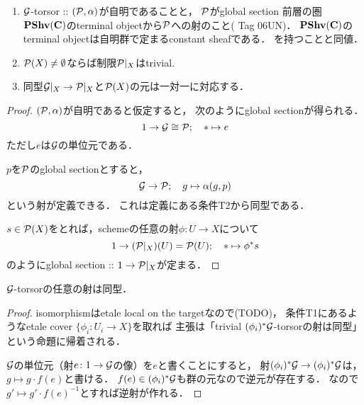     \begin{Lemma}
        \enumfix
        \begin{enumerate}
            \item 
            $\mathcal{G}$-torsor :: $(\mathcal{P}, \alpha)$が自明であることと，
            $\mathcal{P}$がglobal section\tablefootnote
            {
                前層の圏$\mathbf{PShv}(\mathbf{C})$のterminal objectから$\mathcal{P}$への射のこと(\cite{SP} Tag 06UN)．
                $\mathbf{PShv}(\mathbf{C})$のterminal objectは自明群で定まるconstant sheafである．
            }
            を持つことと同値．

            \item $\mathcal{P}(X) \neq \emptyset$ならば制限$\mathcal{P}|_{X}$はtrivial.

            \item 同型$\mathcal{G}|_{X} \to \mathcal{P}|_{X}$と$\mathcal{P}(X)$の元は一対一に対応する．
        \end{enumerate}
    \end{Lemma}
    \begin{proof}
        $(\mathcal{P}, \alpha)$が自明であると仮定すると，
        次のようにglobal sectionが得られる．
        \[ 1 \to \mathcal{G} \cong \mathcal{P}; \quad * \mapsto e \]
        ただし$e$は$\mathcal{G}$の単位元である．

        $p$を$\mathcal{P}$のglobal sectionとすると，
        \[ \mathcal{G} \to \mathcal{P}; \quad g \mapsto \alpha(g, p) \]
        という射が定義できる．
        これは定義にある条件T2から同型である．

        $s \in \mathcal{P}(X)$をとれば，schemeの任意の射$\phi \colon U \to X$について
        \[ 1 \to (\mathcal{P}|_{X})(U)=\mathcal{P}(U);\quad * \mapsto \phi^*s \]
        のようにglobal section :: $1 \to \mathcal{P}|_{X}$が定まる．
    \end{proof}

    \begin{Cor}
        $\mathcal{G}$-torsorの任意の射は同型．
    \end{Cor}
    \begin{proof}
        isomorphismはetale local on the targetなので(TODO)，
        条件T1にあるようなetale cover $\{\phi_i \colon U_i \to X\}$を取れば
        主張は「trivial $(\phi_i)^*\mathcal{G}$-torsorの射は同型」という命題に帰着される．

        $\mathcal{G}$の単位元（射$e \colon 1 \to \mathcal{G}$の像）を$e$と書くことにすると，
        射$(\phi_i)^*\mathcal{G} \to (\phi_i)^*\mathcal{G}$は，$g \mapsto g \cdot f(e)$と書ける．
        $f(e) \in (\phi_i)^*\mathcal{G}$も群の元なので逆元が存在する．
        なので$g' \mapsto g' \cdot f(e)^{-1}$とすれば逆射が作れる．
    \end{proof}

